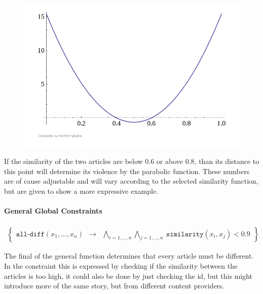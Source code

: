 \begin{figure}%
\myfloatalign
\includegraphics[width=.45\textwidth]{img/curve}
\end{figure}

If the similarity of the two articles are below $0.6$ or above $0.8$, than its distance to this point will determine its violence by the parabolic function. These numbers are of cause adjustable and will vary according to the selected similarity function, but are given to show a more expressive example.
\paragraph{General Global Constraints}
\begin{align}
	\begin{Bmatrix}
		\texttt{all-diff}(x_1,\ldots,x_n) &\rightarrow& \bigwedge\limits_{i=1,\dots,n}\bigwedge\limits_{j=1,\dots,n}\ \texttt{similarity}(x_i,x_j) < 0.9
	\end{Bmatrix}
\end{align}

The final of the general function determines that every article must be different. In the constraint this is expressed by checking if the similarity between the articles is too high, it could also be done by just checking the id, but this might introduce more of the same story, but from different content providers.

